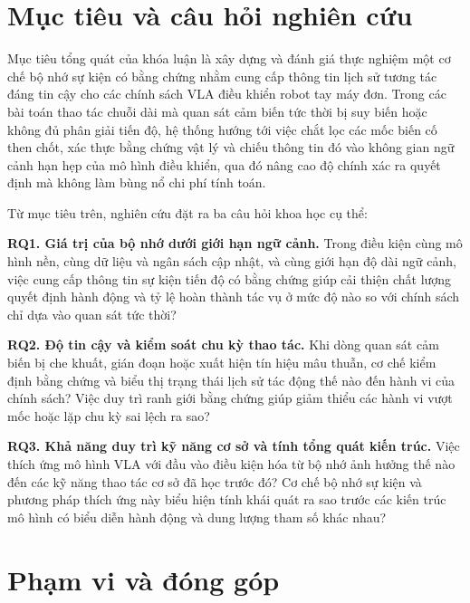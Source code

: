 \section{Mục tiêu và câu hỏi nghiên cứu}

Mục tiêu tổng quát của khóa luận là xây dựng và đánh giá thực nghiệm một cơ chế bộ nhớ sự kiện có bằng chứng nhằm cung cấp thông tin lịch sử tương tác đáng tin cậy cho các chính sách VLA điều khiển robot tay máy đơn. Trong các bài toán thao tác chuỗi dài mà quan sát cảm biến tức thời bị suy biến hoặc không đủ phân giải tiến độ, hệ thống hướng tới việc chắt lọc các mốc biến cố then chốt, xác thực bằng chứng vật lý và chiếu thông tin đó vào không gian ngữ cảnh hạn hẹp của mô hình điều khiển, qua đó nâng cao độ chính xác ra quyết định mà không làm bùng nổ chi phí tính toán.

Từ mục tiêu trên, nghiên cứu đặt ra ba câu hỏi khoa học cụ thể:

\textbf{RQ1. Giá trị của bộ nhớ dưới giới hạn ngữ cảnh.} Trong điều kiện cùng mô hình nền, cùng dữ liệu và ngân sách cập nhật, và cùng giới hạn độ dài ngữ cảnh, việc cung cấp thông tin sự kiện tiến độ có bằng chứng giúp cải thiện chất lượng quyết định hành động và tỷ lệ hoàn thành tác vụ ở mức độ nào so với chính sách chỉ dựa vào quan sát tức thời?

\textbf{RQ2. Độ tin cậy và kiểm soát chu kỳ thao tác.} Khi dòng quan sát cảm biến bị che khuất, gián đoạn hoặc xuất hiện tín hiệu mâu thuẫn, cơ chế kiểm định bằng chứng và biểu thị trạng thái lịch sử tác động thế nào đến hành vi của chính sách? Việc duy trì ranh giới bằng chứng giúp giảm thiểu các hành vi vượt mốc hoặc lặp chu kỳ sai lệch ra sao?

\textbf{RQ3. Khả năng duy trì kỹ năng cơ sở và tính tổng quát kiến trúc.} Việc thích ứng mô hình VLA với đầu vào điều kiện hóa từ bộ nhớ ảnh hưởng thế nào đến các kỹ năng thao tác cơ sở đã học trước đó? Cơ chế bộ nhớ sự kiện và phương pháp thích ứng này biểu hiện tính khái quát ra sao trước các kiến trúc mô hình có biểu diễn hành động và dung lượng tham số khác nhau?

\section{Phạm vi và đóng góp}

